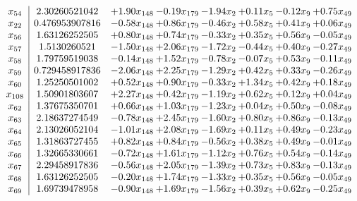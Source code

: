 \documentclass[8pt]{article}
\begin{document}
\[\begin{array}{c| c c@{\hskip 2pt} c@{\hskip 2pt} c@{\hskip 2pt} c@{\hskip 2pt} c@{\hskip 2pt} c@{\hskip 2pt} }
 x_{54}   &  2.30260521042 & +  1.90 x_{148} & -0.19 x_{179} & -1.94 x_{2} & +  0.11 x_{5} & -0.12 x_{9} & +  0.75 x_{49}\\
 x_{22}   &  0.476953907816 & -0.58 x_{148} & +  0.86 x_{179} & -0.46 x_{2} & +  0.58 x_{5} & +  0.41 x_{9} & +  0.06 x_{49}\\
 x_{56}   &  1.63126252505 & +  0.80 x_{148} & +  0.74 x_{179} & -0.33 x_{2} & +  0.35 x_{5} & +  0.56 x_{9} & -0.05 x_{49}\\
 x_{57}   &  1.5130260521 & -1.50 x_{148} & +  2.06 x_{179} & -1.72 x_{2} & -0.44 x_{5} & +  0.40 x_{9} & -0.27 x_{49}\\
 x_{58}   &  1.79759519038 & -0.14 x_{148} & +  1.52 x_{179} & -0.78 x_{2} & -0.07 x_{5} & +  0.53 x_{9} & -0.11 x_{49}\\
 x_{59}   &  0.729458917836 & -2.06 x_{148} & +  2.25 x_{179} & -1.29 x_{2} & +  0.42 x_{5} & +  0.33 x_{9} & -0.26 x_{49}\\
 x_{60}   &  1.25250501002 & +  0.52 x_{148} & +  0.90 x_{179} & -0.33 x_{2} & +  1.34 x_{5} & +  0.42 x_{9} & +  0.18 x_{49}\\
 x_{108}   &  1.50901803607 & +  2.27 x_{148} & +  0.42 x_{179} & -1.19 x_{2} & +  0.62 x_{5} & +  0.12 x_{9} & +  0.04 x_{49}\\
 x_{62}   &  1.37675350701 & +  0.66 x_{148} & +  1.03 x_{179} & -1.23 x_{2} & +  0.04 x_{5} & +  0.50 x_{9} & -0.08 x_{49}\\
 x_{63}   &  2.18637274549 & -0.78 x_{148} & +  2.45 x_{179} & -1.60 x_{2} & +  0.80 x_{5} & +  0.86 x_{9} & -0.13 x_{49}\\
 x_{64}   &  2.13026052104 & -1.01 x_{148} & +  2.08 x_{179} & -1.69 x_{2} & +  0.11 x_{5} & +  0.49 x_{9} & -0.23 x_{49}\\
 x_{65}   &  1.31863727455 & +  0.82 x_{148} & +  0.84 x_{179} & -0.56 x_{2} & +  0.38 x_{5} & +  0.49 x_{9} & -0.01 x_{49}\\
 x_{66}   &  1.32665330661 & -0.72 x_{148} & +  1.61 x_{179} & -1.12 x_{2} & +  0.76 x_{5} & +  0.54 x_{9} & -0.14 x_{49}\\
 x_{67}   &  2.29458917836 & -0.56 x_{148} & +  2.05 x_{179} & -1.39 x_{2} & +  0.73 x_{5} & +  0.83 x_{9} & -0.13 x_{49}\\
 x_{68}   &  1.63126252505 & -0.20 x_{148} & +  1.74 x_{179} & -1.33 x_{2} & +  0.35 x_{5} & +  0.56 x_{9} & -0.05 x_{49}\\
 x_{69}   &  1.69739478958 & -0.90 x_{148} & +  1.69 x_{179} & -1.56 x_{2} & +  0.39 x_{5} & +  0.62 x_{9} & -0.25 x_{49}\\

\end{array}\]
\end{document}

